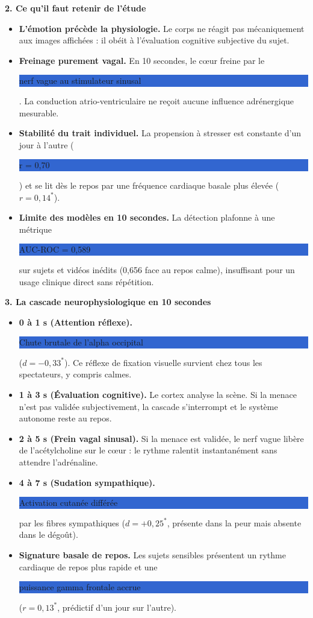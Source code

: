 \documentclass[10pt,a4paper]{article}
\newcommand{\hl}[1]{\colorbox{highlight}{\strut #1}}
\begin{document}
\vspace{5pt}

{\large\bfseries 2. Ce qu'il faut retenir de l'étude}

\vspace{2pt}

\begin{itemize}
  \item \textbf{L'émotion précède la physiologie.} Le corps ne réagit pas mécaniquement aux images affichées : il obéit à l'évaluation cognitive subjective du sujet.
  \item \textbf{Freinage purement vagal.} En 10 secondes, le cœur freine par le \hl{nerf vague au stimulateur sinusal}. La conduction atrio-ventriculaire ne reçoit aucune influence adrénergique mesurable.
  \item \textbf{Stabilité du trait individuel.} La propension à stresser est constante d'un jour à l'autre (\hl{r = 0,70}) et se lit dès le repos par une fréquence cardiaque basale plus élevée ($r = 0,14^*$).
  \item \textbf{Limite des modèles en 10 secondes.} La détection plafonne à une métrique \hl{AUC-ROC = 0,589} sur sujets et vidéos inédits (0,656 face au repos calme), insuffisant pour un usage clinique direct sans répétition.
\end{itemize}

\vspace{5pt}

{\large\bfseries 3. La cascade neurophysiologique en 10 secondes}

\vspace{2pt}

\begin{itemize}
  \item \textbf{0 à 1 s (Attention réflexe).} \hl{Chute brutale de l'alpha occipital} ($d = -0,33^*$). Ce réflexe de fixation visuelle survient chez tous les spectateurs, y compris calmes.
  \item \textbf{1 à 3 s (Évaluation cognitive).} Le cortex analyse la scène. Si la menace n'est pas validée subjectivement, la cascade s'interrompt et le système autonome reste au repos.
  \item \textbf{2 à 5 s (Frein vagal sinusal).} Si la menace est validée, le nerf vague libère de l'acétylcholine sur le cœur : le rythme ralentit instantanément sans attendre l'adrénaline.
  \item \textbf{4 à 7 s (Sudation sympathique).} \hl{Activation cutanée différée} par les fibres sympathiques ($d = +0,25^*$, présente dans la peur mais absente dans le dégoût).
  \item \textbf{Signature basale de repos.} Les sujets sensibles présentent un rythme cardiaque de repos plus rapide et une \hl{puissance gamma frontale accrue} ($r = 0,13^*$, prédictif d'un jour sur l'autre).
\end{itemize}
\end{document}
